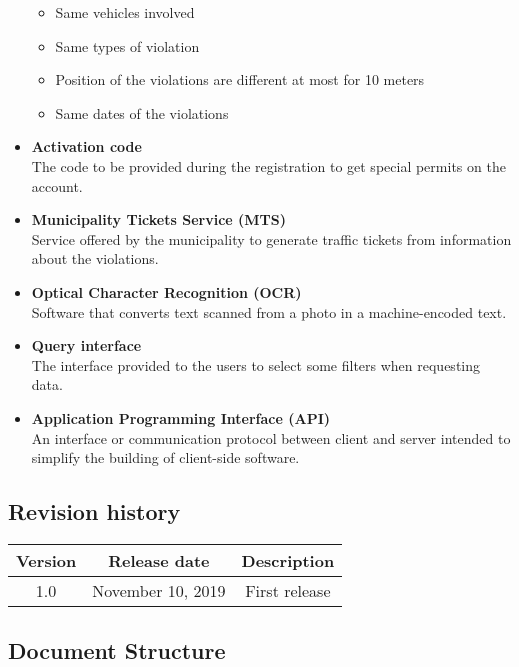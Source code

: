 \documentclass[./main.tex]{subfiles}
\begin{document}
\begin{itemize}
  \begin{itemize}
  \item
    Same vehicles involved
  \item
    Same types of violation
  \item
    Position of the violations are different at most for 10 meters
  \item
    Same dates of the violations
  \end{itemize}
\item
  \textbf{Activation code}\\
  The code to be provided during the registration to get special permits
  on the account.
\item
  \textbf{Municipality Tickets Service (MTS)}\\
  Service offered by the municipality to generate traffic tickets from
  information about the violations.
\item
  \textbf{Optical Character Recognition (OCR)}\\
  Software that converts text scanned from a photo in a machine-encoded
  text.
\item
  \textbf{Query interface}\\
  The interface provided to the users to select some filters when
  requesting data.
\item
  \textbf{Application Programming Interface (API)}\\
  An interface or communication protocol between client and server
  intended to simplify the building of client-side software.
\end{itemize}

\subsection{Revision history}

\begin{table}[H]
\centering
\begin{tabular}{|c|c|c|}
\hline
Version & Release date & Description\tabularnewline
\hline
1.0 & November 10, 2019 & First release\tabularnewline
\hline
\end{tabular}
\end{table}

\subsection{Document Structure}
\end{document}
